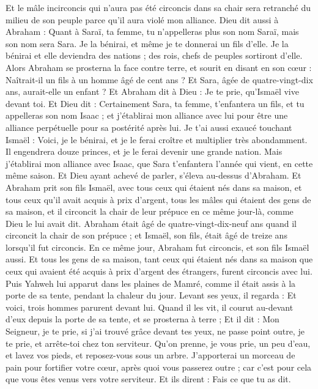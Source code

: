 \begin{multicols}{2}
Et le mâle incirconcis qui n’aura pas été circoncis dans sa  chair sera retranché du milieu de son peuple parce qu'il aura violé mon alliance.
Dieu dit aussi à Abraham : Quant à Saraï, ta femme, tu n'appelleras plus son nom Saraï, mais son nom sera Sara.
Je la bénirai, et même je te donnerai un fils d'elle. Je la bénirai et elle deviendra des nations ; des rois, chefs de peuples sortiront d'elle.
Alors Abraham se prosterna la face contre terre, et sourit en disant en son cœur : Naîtrait-il un fils à un homme âgé de cent ans ? Et Sara, âgée de quatre-vingt-dix ans, aurait-elle un enfant ?
Et Abraham dit à Dieu : Je te prie, qu'Ismaël vive devant toi.
Et Dieu dit : Certainement Sara, ta femme, t'enfantera un fils, et tu appelleras son nom Isaac ; et j'établirai mon alliance avec lui pour être une alliance perpétuelle pour sa postérité après lui.
Je t'ai aussi exaucé touchant Ismaël : Voici, je le bénirai, et je le ferai croître et multiplier très abondamment. Il engendrera douze princes, et je le ferai devenir une grande nation.
Mais j'établirai mon alliance avec Isaac, que Sara t'enfantera l'année qui vient, en cette même saison.
Et Dieu ayant achevé de parler, s’éleva au-dessus d'Abraham.
Et Abraham prit son fils Ismaël, avec tous ceux qui étaient nés dans sa maison, et tous ceux qu'il avait acquis à prix d’argent, tous les mâles qui étaient des gens de sa maison, et il circoncit la chair de leur prépuce en ce même jour-là, comme Dieu le lui avait dit.
Abraham était âgé de quatre-vingt-dix-neuf ans quand il circoncit la chair de son prépuce ;
et Ismaël, son fils, était âgé de treize ans lorsqu'il fut circoncis.
En ce même jour, Abraham fut circoncis, et son fils Ismaël aussi.
Et tous les gens de sa maison, tant ceux qui étaient nés dans sa maison que ceux qui avaient été acquis à prix d’argent des étrangers, furent circoncis avec lui.
\VerseOne{}Puis Yahweh lui apparut dans les plaines de Mamré, comme il était assis à la porte de sa tente, pendant la chaleur du jour.
Levant ses yeux, il regarda : Et voici, trois hommes parurent devant lui. Quand il les vit, il courut au-devant d'eux depuis la porte de sa tente, et se prosterna à terre ;
Et il dit : Mon Seigneur, je te prie, si j'ai trouvé grâce devant tes yeux, ne passe point outre, je te prie, et arrête-toi chez ton serviteur.
Qu'on prenne, je vous prie, un peu d'eau, et lavez vos pieds, et reposez-vous sous un arbre.
J’apporterai un morceau de pain pour fortifier votre cœur, après quoi vous passerez outre ; car c'est pour cela que vous êtes venus vers votre serviteur. Et ils dirent : Fais ce que tu as dit.

\end{multicols}
